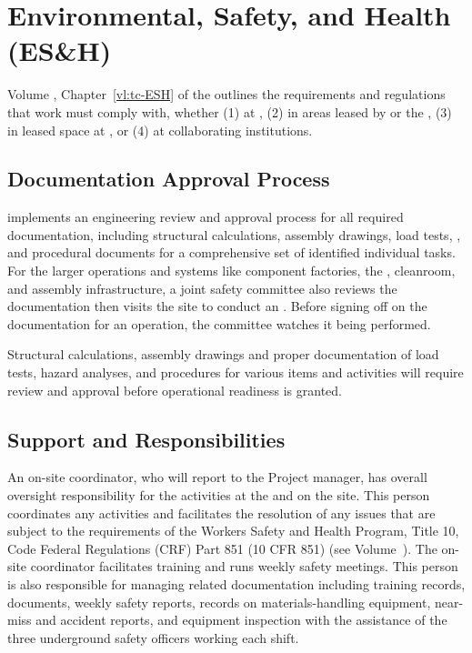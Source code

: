 \section{Environmental, Safety, and Health (ES\&H)}
\label{sec:fdsp-tc-safety}

 Volume \volnumbertc{}, Chapter~\ref{vl:tc-ESH} of the   outlines the requirements and regulations that  work must comply with, whether (1) at , (2) in areas  leased by  or the , (3) in leased space at , or (4) at collaborating institutions.
 
\subsection{Documentation Approval Process}


 implements an engineering review and approval process for all required documentation, including structural calculations, assembly drawings, load tests, , and procedural documents for a comprehensive set of identified individual tasks.  For the larger operations and systems like  component factories, the , cleanroom, and assembly infrastructure, a joint safety committee also reviews the documentation then visits the site to conduct
 an . Before signing off on the documentation for an operation, the committee watches it being performed. 
 
 Structural calculations, assembly drawings and proper documentation of  load tests, hazard analyses, and procedures for various items and activities will require review and approval before operational readiness is granted. 

 
\subsection{Support and Responsibilities}

An on-site  coordinator, who will report to the  Project  manager, has overall  oversight responsibility for the  activities at the   and on the  site. 
This person coordinates any  activities and facilitates the resolution of any issues that are subject to the requirements of the  Workers Safety and Health Program, Title 10, Code Federal Regulations (CRF) Part 851 (10 CFR 851) (see Volume~\volnumbertc{}).  The on-site  coordinator facilitates training and runs weekly safety meetings. This  person is also responsible for managing  related  documentation including training records,  documents, weekly safety reports, records on materials-handling equipment, near-miss and accident reports, and equipment inspection with the assistance of the three  underground safety officers working each shift. 

